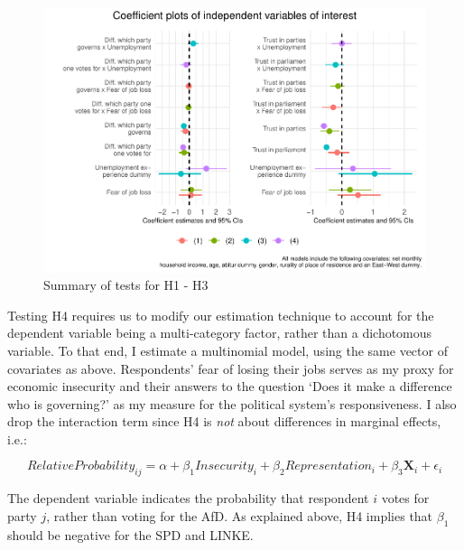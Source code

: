 \documentclass[
]{article}
\begin{document}
\begin{figure}
\centering
\includegraphics{AVCD_Final-Assignment-Edenhofer_files/figure-latex/regression-results1-plot-1.pdf}
\caption{Summary of tests for H1 - H3}
\end{figure}

Testing H4 requires us to modify our estimation technique to account for
the dependent variable being a multi-category factor, rather than a
dichotomous variable. To that end, I estimate a multinomial model, using
the same vector of covariates as above. Respondents' fear of losing
their jobs serves as my proxy for economic insecurity and their answers
to the question `Does it make a difference who is governing?' as my
measure for the political system's responsiveness. I also drop the
interaction term since H4 is \emph{not} about differences in marginal
effects, i.e.:

\[
RelativeProbability_{ij} = \alpha + \beta_{1}Insecurity_{i} +  \beta_{2}Representation_{i} + \beta_{3}\textbf{X}_{i} + \epsilon_{i}
\]

The dependent variable indicates the probability that respondent \(i\)
votes for party \(j\), rather than voting for the AfD. As explained
above, H4 implies that \(\beta_{1}\) should be negative for the SPD and
LINKE.
\end{document}
